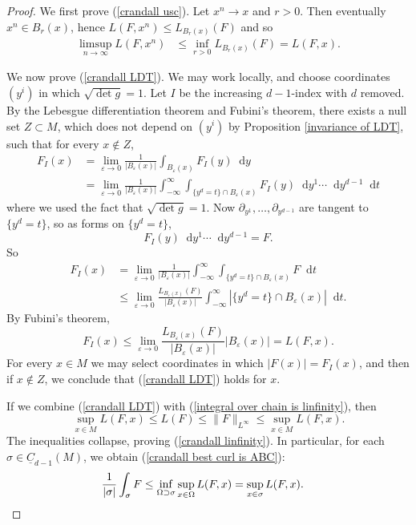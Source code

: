 \documentclass[reqno,11pt]{amsart}
\newcommand*\dif{\mathop{}\!\mathrm{d}}
\newcommand{\Chain}{\underline C}
\theoremstyle{definition}
\numberwithin{equation}{section}
\begin{document}
\begin{proof}
We first prove (\ref{crandall usc}).
Let $x^n \to x$ and $r > 0$. Then eventually $x^n \in B_r(x)$, hence $L(F, x^n) \leq L_{B_r(x)}(F)$ and so
\begin{align*}
\limsup_{n \to \infty} L(F, x^n) &\leq \inf_{r > 0} L_{B_r(x)}(F) = L(F, x).
\end{align*}

We now prove (\ref{crandall LDT}).
We may work locally, and choose coordinates $(y^i)$ in which $\sqrt{\det g} = 1$.
Let $I$ be the increasing $d-1$-index with $d$ removed.
By the Lebesgue differentiation theorem and Fubini's theorem, there exists a null set $Z \subset M$, which does not depend on $(y^i)$ by Proposition \ref{invariance of LDT}, such that for every $x \notin Z$,
\begin{align*}
F_I(x) 
&= \lim_{\varepsilon \to 0} \frac{1}{|B_\varepsilon(x)|} \int_{B_\varepsilon(x)} F_I(y) \dif y \\
&= \lim_{\varepsilon \to 0} \frac{1}{|B_\varepsilon(x)|} \int_{-\infty}^\infty \int_{\{y^d = t\} \cap B_\varepsilon(x)} F_I(y) \dif y^1 \cdots \dif y^{d - 1} \dif t
\end{align*}
where we used the fact that $\sqrt{\det g} = 1$.
Now $\partial_{y^1}, \dots, \partial_{y^{d - 1}}$ are tangent to $\{y^d = t\}$, so as forms on $\{y^d = t\}$,
$$F_I(y) \dif y^1 \cdots \dif y^{d - 1} = F.$$
So
\begin{align*}
F_I(x) 
&= \lim_{\varepsilon \to 0} \frac{1}{|B_\varepsilon(x)|} \int_{-\infty}^\infty \int_{\{y^d = t\} \cap B_\varepsilon(x)} F \dif t \\
&\leq \lim_{\varepsilon \to 0} \frac{L_{B_\varepsilon(x)}(F)}{|B_\varepsilon(x)|} \int_{-\infty}^\infty |\{y^d = t\} \cap B_\varepsilon(x)| \dif t.
\end{align*}
By Fubini's theorem,
$$F_I(x) \leq \lim_{\varepsilon \to 0} \frac{L_{B_\varepsilon(x)}(F)}{|B_\varepsilon(x)|} |B_\varepsilon(x)| = L(F, x).$$
For every $x \in M$ we may select coordinates in which $|F(x)| = F_I(x)$, and then if $x \notin Z$, we conclude that (\ref{crandall LDT}) holds for $x$.

If we combine (\ref{crandall LDT}) with (\ref{integral over chain is linfinity}), then
$$\sup_{x \in M} L(F, x) \leq L(F) \leq \|F\|_{L^\infty} \leq \sup_{x \in M} L(F, x).$$
The inequalities collapse, proving (\ref{crandall linfinity}).
In particular, for each $\sigma \in \Chain_{d - 1}(M)$, we obtain (\ref{crandall best curl is ABC}):
\begin{align*}
\frac{1}{|\sigma|} \int_\sigma F &\leq \inf_{\Omega \supset \sigma} \sup_{x \in \Omega} L(F, x) = \sup_{x \in \sigma} L(F, x). \qedhere
\end{align*}
\end{proof}
\end{document}
